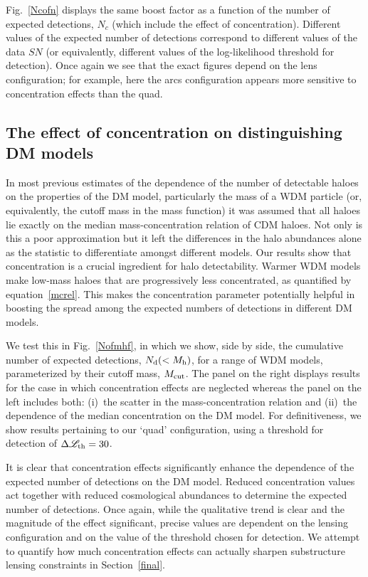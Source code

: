 \documentclass[a4paper, fleqn, usenatbib, useAMS]{mnras}
\def\DL{\Delta\mathscr{L}}
\begin{document}
Fig.~\ref{Ncofn} displays the same boost factor as a function of the number of expected
detections, $N_c$ (which include the effect of
concentration). Different values of the expected number of detections correspond
to different values of the data $SN$ (or equivalently, different values of the log-likelihood threshold for detection). Once
again we see that the exact figures depend on the lens configuration;
for example, 
here the arcs configuration appears more sensitive to concentration
effects than the quad.




\subsection{The effect of concentration on distinguishing DM models}
\label{concentrationdependence2}


In most previous estimates of the dependence of the number of
detectable haloes on the properties of the DM model, particularly the
mass of a WDM particle (or, equivalently, the cutoff mass in the
mass function) it was assumed that all haloes lie exactly on the
median mass-concentration relation of CDM haloes.
Not only is this a poor approximation but it left the differences in
the halo abundances alone as the statistic to differentiate amongst
different models. Our results show that concentration is a crucial
ingredient for halo detectability.  Warmer WDM models make low-mass
haloes that are progressively less concentrated, as quantified by
equation~\ref{mcrel}. This makes the concentration parameter potentially helpful in
boosting the spread among the expected numbers of detections in
different DM models.

We test this in Fig.~\ref{Nofmhf}, in which we show, side by side, the cumulative number
of expected detections, $N_{\rm d}(<M_{\rm h})$, for a range of WDM models,
parameterized by their cutoff mass, $M_{\rm cut}$. The panel on the right displays results
for the case in which concentration effects are neglected whereas the
panel on the left includes 
both: (i)~the scatter in the mass-concentration relation and (ii)~the dependence of the median concentration
on the DM model. For definitiveness, we show results pertaining to our `quad' configuration,  
using a threshold for detection of  $\DL_{\rm th}=30$. 

It is clear that concentration effects significantly enhance the dependence of the 
expected number of detections on the DM model. Reduced 
concentration values act together with 
reduced cosmological abundances to determine the expected number of detections. 
Once again, while the qualitative trend is clear and the magnitude of the effect significant, 
precise values are dependent on the lensing configuration and on the value of the 
threshold chosen for detection. We attempt to quantify how much concentration 
effects can actually sharpen substructure lensing constraints in Section~\ref{final}.
\end{document}
